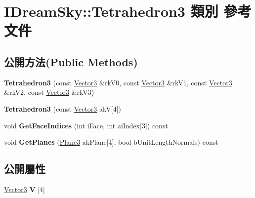 \hypertarget{class_i_dream_sky_1_1_tetrahedron3}{}\section{I\+Dream\+Sky\+:\+:Tetrahedron3 類別 參考文件}
\label{class_i_dream_sky_1_1_tetrahedron3}
\subsection*{公開方法(Public Methods)}
\begin{DoxyCompactItemize}
\item 
{\bfseries Tetrahedron3} (const \hyperlink{class_i_dream_sky_1_1_vector3}{Vector3} \&rk\+V0, const \hyperlink{class_i_dream_sky_1_1_vector3}{Vector3} \&rk\+V1, const \hyperlink{class_i_dream_sky_1_1_vector3}{Vector3} \&rk\+V2, const \hyperlink{class_i_dream_sky_1_1_vector3}{Vector3} \&rk\+V3)\hypertarget{class_i_dream_sky_1_1_tetrahedron3_af20977691015e686607e29b03976db08}{}\label{class_i_dream_sky_1_1_tetrahedron3_af20977691015e686607e29b03976db08}

\item 
{\bfseries Tetrahedron3} (const \hyperlink{class_i_dream_sky_1_1_vector3}{Vector3} akV\mbox{[}4\mbox{]})\hypertarget{class_i_dream_sky_1_1_tetrahedron3_a2712664a682414b5661d803853634b45}{}\label{class_i_dream_sky_1_1_tetrahedron3_a2712664a682414b5661d803853634b45}

\item 
void {\bfseries Get\+Face\+Indices} (int i\+Face, int ai\+Index\mbox{[}3\mbox{]}) const \hypertarget{class_i_dream_sky_1_1_tetrahedron3_aedd6eff8a2df7cb55d7e3104b415f549}{}\label{class_i_dream_sky_1_1_tetrahedron3_aedd6eff8a2df7cb55d7e3104b415f549}

\item 
void {\bfseries Get\+Planes} (\hyperlink{class_i_dream_sky_1_1_plane3}{Plane3} ak\+Plane\mbox{[}4\mbox{]}, bool b\+Unit\+Length\+Normals) const \hypertarget{class_i_dream_sky_1_1_tetrahedron3_af4c35aec7d8ade1247611f3c2cd0e1e8}{}\label{class_i_dream_sky_1_1_tetrahedron3_af4c35aec7d8ade1247611f3c2cd0e1e8}

\end{DoxyCompactItemize}
\subsection*{公開屬性}
\begin{DoxyCompactItemize}
\item 
\hyperlink{class_i_dream_sky_1_1_vector3}{Vector3} {\bfseries V} \mbox{[}4\mbox{]}\hypertarget{class_i_dream_sky_1_1_tetrahedron3_a36f7b0accfaa5e830a1c8e1e370dcbf1}{}\label{class_i_dream_sky_1_1_tetrahedron3_a36f7b0accfaa5e830a1c8e1e370dcbf1}

\end{DoxyCompactItemize}


